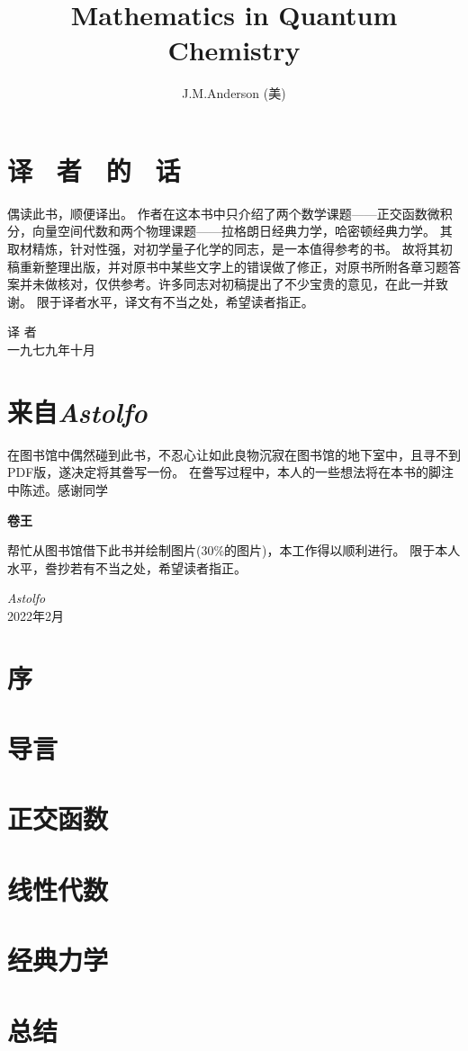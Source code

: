 \documentclass[lang=cn,10pt]{elegantbook}
\title{Mathematics in Quantum Chemistry}
\author{J.M.Anderson (美)}
\begin{document}
\maketitle
\frontmatter


\mainmatter

\chapter*{译 \ 者 \ 的 \ 话}
\setcounter{page}{1}
偶读此书，顺便译出。
作者在这本书中只介绍了两个数学课题——正交函数微积分，向量空间代数和两个物理课题——拉格朗日经典力学，哈密顿经典力学。
其取材精炼，针对性强，对初学量子化学的同志，是一本值得参考的书。
故将其初稿重新整理出版，并对原书中某些文字上的错误做了修正，对原书所附各章习题答案并未做核对，仅供参考。许多同志对初稿提出了不少宝贵的意见，在此一并致谢。
限于译者水平，译文有不当之处，希望读者指正。
\begin{flushright}
    译 \qquad 者 \\ 一九七九年十月
\end{flushright}
\chapter*{来自\textit{Astolfo}}
在图书馆中偶然碰到此书，不忍心让如此良物沉寂在图书馆的地下室中，且寻不到PDF版，遂决定将其誊写一份。
在誊写过程中，本人的一些想法将在本书的脚注中陈述。感谢同学
\begin{Large}
\textbf{卷王}
\end{Large}
帮忙从图书馆借下此书并绘制图片(30\%的图片)，本工作得以顺利进行。
限于本人水平，誊抄若有不当之处，希望读者指正。
\begin{flushright}
    \textit{Astolfo} \\ 2022年2月
\end{flushright}
\chapter*{序}

\tableofcontents
\thispagestyle{empty}
\newpage
\setcounter{page}{1}
\chapter{导言}

\chapter{正交函数}

\chapter{线性代数}

\chapter{经典力学}

\chapter{总结}

\end{document}
